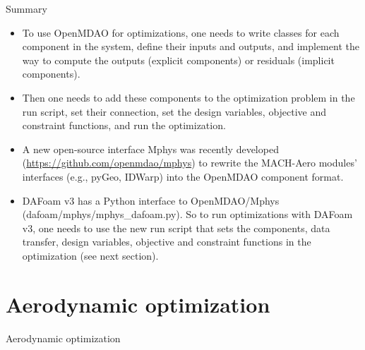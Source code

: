 \documentclass{bredelebeamer}
\begin{document}
\begin{frame}[fragile]{Summary}
  \begin{itemize}
    \setlength\itemsep{1em}
   \item To use OpenMDAO for optimizations, one needs to write classes for each component in the system, define their inputs and outputs, and implement the way to compute the outputs (explicit components) or residuals (implicit components). 
   \item Then one needs to add these components to the optimization problem in the run script, set their connection, set the design variables, objective and constraint functions, and run the optimization.
   \item A new open-source interface Mphys was recently developed (\url{https://github.com/openmdao/mphys}) to rewrite the MACH-Aero modules' interfaces (e.g., pyGeo, IDWarp) into the OpenMDAO component format. 
   \item DAFoam v3 has a Python interface to OpenMDAO/Mphys (dafoam/mphys/mphys\_dafoam.py). So to run optimizations with DAFoam v3, one needs to use the new run script that sets the components, data transfer, design variables, objective and constraint functions in the optimization (see next section).
  \end{itemize}
\end{frame}


\section{Aerodynamic optimization}
\renewcommand{\arraystretch}{2}

\begin{frame}{}
  \center \Large Aerodynamic optimization
\end{frame}
\end{document}
